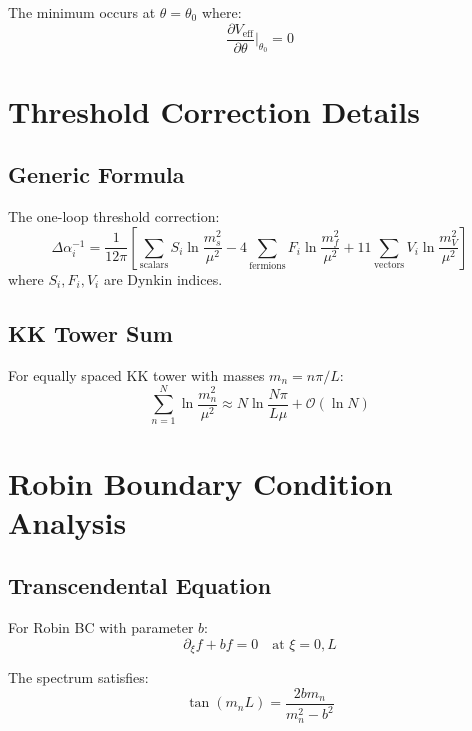 \documentclass[11pt,a4paper]{article}
\begin{document}
The minimum occurs at $\theta = \theta_0$ where:
\begin{equation}
\frac{\partial V_{\text{eff}}}{\partial \theta}\bigg|_{\theta_0} = 0
\label{eq:hosotani-min}
\end{equation}

\section{Threshold Correction Details}
\label{app:threshold}

\subsection{Generic Formula}

The one-loop threshold correction:
\begin{equation}
\Delta \alpha_i^{-1} = \frac{1}{12\pi}\left[
\sum_{\text{scalars}} S_i \ln\frac{m_s^2}{\mu^2}
- 4 \sum_{\text{fermions}} F_i \ln\frac{m_f^2}{\mu^2}
+ 11 \sum_{\text{vectors}} V_i \ln\frac{m_V^2}{\mu^2}
\right]
\label{eq:threshold-generic}
\end{equation}
where $S_i, F_i, V_i$ are Dynkin indices.

\subsection{KK Tower Sum}

For equally spaced KK tower with masses $m_n = n\pi/L$:
\begin{equation}
\sum_{n=1}^{N} \ln\frac{m_n^2}{\mu^2} \approx N \ln\frac{N\pi}{L\mu} + \mathcal{O}(\ln N)
\label{eq:tower-sum}
\end{equation}

\section{Robin Boundary Condition Analysis}
\label{app:robin}

\subsection{Transcendental Equation}

For Robin BC with parameter $b$:
\begin{equation}
\partial_\xi f + b f = 0 \quad \text{at } \xi = 0,L
\label{eq:robin-bc}
\end{equation}

The spectrum satisfies:
\begin{equation}
\tan(m_n L) = \frac{2 b m_n}{m_n^2 - b^2}
\label{eq:robin-spectrum}
\end{equation}
\end{document}
